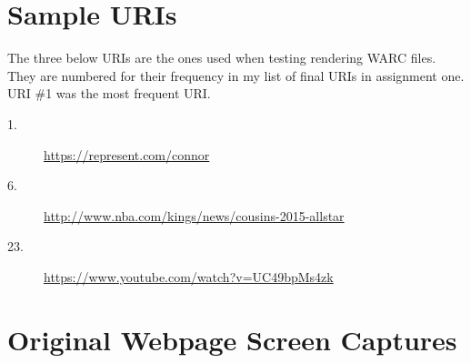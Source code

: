 \documentclass[a4paper,12pt]{article}
\begin{document}
\clearpage
\begin{appendices}

\section{Sample URIs}
The three below URIs are the ones used when testing rendering WARC files. They are numbered for their
frequency in my list of final URIs in assignment one. URI \#1 was the most frequent URI.
\begin{description}
 \item[1.] \url{https://represent.com/connor}
 \item[6.] \url{http://www.nba.com/kings/news/cousins-2015-allstar}
 \item[23.] \url{https://www.youtube.com/watch?v=UC49bpMs4zk}
\end{description}

\section{Original Webpage Screen Captures}


\end{appendices}
\end{document}
